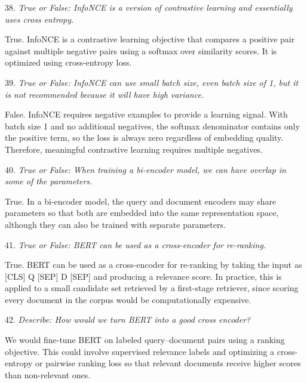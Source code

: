 \vspace{1cm}

38. \textit{True or False: InfoNCE is a version of contrastive learning and essentially uses cross entropy.}

True. InfoNCE is a contrastive learning objective that compares a positive pair against multiple negative pairs using a softmax over similarity scores. It is optimized using cross-entropy loss.

\vspace{1cm}

39. \textit{True or False: InfoNCE can use small batch size, even batch size of 1, but it is not recommended because it will have high variance.}

False. InfoNCE requires negative examples to provide a learning signal. With batch size 1 and no additional negatives, the softmax denominator contains only the positive term, so the loss is always zero regardless of embedding quality. Therefore, meaningful contrastive learning requires multiple negatives.

\vspace{1cm}

40. \textit{True or False: When training a bi-encoder model, we can have overlap in some of the parameters.}

True. In a bi-encoder model, the query and document encoders may share parameters so that both are embedded into the same representation space, although they can also be trained with separate parameters.

\vspace{1cm}

41. \textit{True or False: BERT can be used as a cross-encoder for re-ranking.}

True. BERT can be used as a cross-encoder for re-ranking by taking the input as [CLS] Q [SEP] D [SEP] and producing a relevance score. In practice, this is applied to a small candidate set retrieved by a first-stage retriever, since scoring every document in the corpus would be computationally expensive.

\vspace{1cm}

42. \textit{Describe: How would we turn BERT into a good cross encoder?}

We would fine-tune BERT on labeled query–document pairs using a ranking objective. This could involve supervised relevance labels and optimizing a cross-entropy or pairwise ranking loss so that relevant documents receive higher scores than non-relevant ones.

